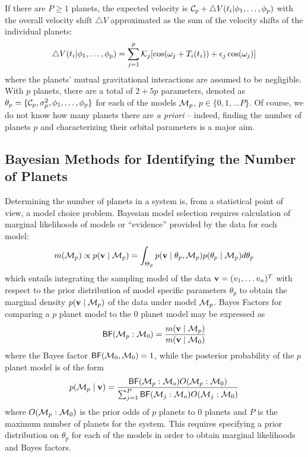 If there are $P \ge 1$ planets, the expected velocity is ${\cal{C}}_p
+ \bigtriangleup V(t_i|\phi_1,\ldots,\phi_p)$ with the overall velocity shift
$\bigtriangleup V$  approximated as the sum of the velocity
shifts of the individual planets:
\begin{equation}\label{Velocity_2p_Model}
\bigtriangleup V(t_i|\phi_1,\ldots,\phi_p)=\sum_{j=1}^p
\K_j[\cos(\omega_j+T_i(t_i))+\e_j\cos(\omega_j)]
\end{equation}
where the planets' mutual gravitational interactions are assumed to be
negligible.  With $p$ planets, there are a total of $2+5p$ parameters,
denoted as 
$\theta_p = \{ \mathcal{C}_p,\sigma_p^2,\phi_1,\ldots,\phi_p\}$ for each of
the models ${\cal{M}}_p$, $p \in \{0, 1, \ldots P\}$. Of course, we do not
know how many planets there are \emph{a priori} -- indeed, finding the
number of planets $p$ and characterizing their orbital parameters is
a major aim.

\subsection{Bayesian Methods for Identifying the Number of Planets}
Determining the number of planets in a
system is, from a statistical point of view, a model choice
problem. Bayesian model selection requires calculation of marginal
likelihoods of models or ``evidence'' provided by the data for each model:
\begin{equation}\label{marginal_lik}
m( \M_p) \propto p(\v \mid \M_p) = \int_{\Theta_p}
p(\v \mid \theta_p,\M_p) p(\theta_p \mid \M_p) d\theta_p
\end{equation} 
which entails integrating the sampling model of the
data $\mathbf{v} = (v_1, \ldots v_n)^T$ with respect to the prior distribution
of model specific parameters $\theta_p$ to obtain the marginal
density $p(\mathbf{v} \mid {\cal{M}}_p)$ of the data under model ${\cal{M}}_p$.
Bayes Factors for comparing a $p$ planet model to the $0$ planet model
may be expressed  as
\begin{equation}
\BF(\M_p:\M_0)=\frac{m( \v \mid \M_p)}{m(\v \mid \M_0)}
\end{equation}
where the Bayes factor $\textsf{BF}({\cal{M}}_0,{\cal{M}}_0) = 1$,
while the posterior probability of the $p$ planet model is of the
form
\begin{equation}
  \label{eq:post-prob}
  p(\M_p \mid \v) = \frac{\BF(\M_p:\M_o) O(\M_p: \M_0)} 
{ \sum_{ j= 1}^{P} \BF(\M_j:\M_o) O(\M_j: \M_0)}
\end{equation}
where $O({\cal{M}}_p: {\cal{M}}_0)$ is the prior odds of $p$ planets to $0$
planets and $P$ is the maximum number of planets for the
system.  This requires specifying a prior distribution on $\theta_p$
for each of the models in order to obtain marginal likelihoods and
Bayes factors.

